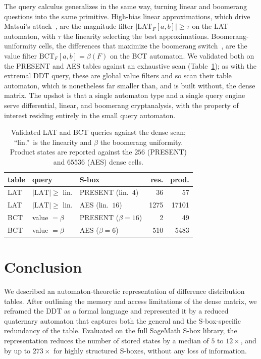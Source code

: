 \documentclass[runningheads]{llncs}
\newcommand{\LAT}{\mathrm{LAT}}
\newcommand{\BCT}{\mathrm{BCT}}
\begin{document}
The query calculus generalizes in the same way, turning linear and boomerang
questions into the same primitive. High-bias linear approximations, which drive
Matsui's attack~\cite{matsuilc}, are the magnitude filter $|\LAT_F[a,b]|\ge\tau$
on the LAT automaton, with $\tau$ the linearity selecting the best approximations.
Boomerang-uniformity cells, the differences that maximize the boomerang
switch~\cite{wagner,bct}, are the value filter $\BCT_F[a,b]=\beta(F)$ on the BCT
automaton. We validated both on the PRESENT and AES tables against an exhaustive
scan (Table~\ref{tab:latbct}); as with the extremal DDT query, these are global
value filters and so scan their table automaton, which is nonetheless far smaller
than, and is built without, the dense matrix. The upshot is that a single
automaton type and a single query engine serve differential, linear, and boomerang
cryptanalysis, with the property of interest residing entirely in the small query
automaton.

\begin{table}[t]
\centering
\caption{Validated LAT and BCT queries against the dense scan; ``lin.''\ is the
linearity and $\beta$ the boomerang uniformity. Product states are reported
against the $256$ (PRESENT) and $65536$ (AES) dense cells.}
\label{tab:latbct}
\begin{tabular}{l l l r r}
\toprule
table & query & S-box & res. & prod.\\
\midrule
LAT & $|\LAT|\ge$ lin. & PRESENT (lin.\ $4$) & 36   & 57\\
LAT & $|\LAT|\ge$ lin. & AES (lin.\ $16$)    & 1275 & 17101\\
BCT & value $=\beta$ & PRESENT ($\beta{=}16$) & 2    & 49\\
BCT & value $=\beta$ & AES ($\beta{=}6$)      & 510  & 5483\\
\bottomrule
\end{tabular}
\end{table}

\section{Conclusion}
\label{sec:conclusion}

We described an automaton-theoretic representation of difference distribution
tables. After outlining the memory and access limitations of the dense matrix, we
reframed the DDT as a formal language and represented it by a reduced quaternary
automaton that captures both the general and the S-box-specific redundancy of the
table. Evaluated on the full SageMath S-box library, the representation reduces
the number of stored states by a median of $5$ to $12\times$, and by up to
$273\times$ for highly structured S-boxes, without any loss of information.
\end{document}
